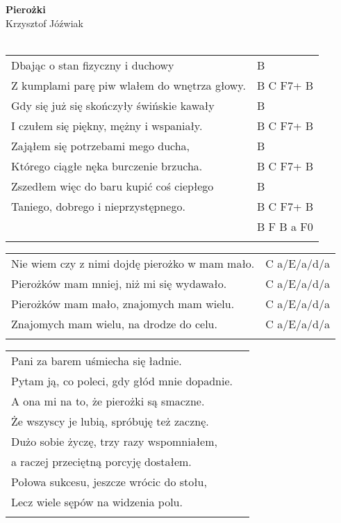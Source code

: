 \documentclass[a5paper]{article}
\begin{document}


\noindent
\fontsize{12pt}{15pt}\selectfont
\textbf{Pierożki} \\
\fontsize{8pt}{10pt}\selectfont
Krzysztof Jóźwiak \\ \\
\fontsize{10pt}{12pt}\selectfont
{}
\begin{tabular}{@{}p{8.50cm}p{3cm}@{}}
\noindent
Dbając o stan fizyczny i duchowy & B \\
Z kumplami parę piw wlałem do wnętrza głowy. & B C F7+ B \\
Gdy się już się skończyły świńskie kawały & B \\
I czułem się piękny, mężny i wspaniały. & B C F7+ B \\
Zająłem się potrzebami mego ducha, & B \\
Którego ciągłe nęka burczenie brzucha. & B C F7+ B \\
Zszedłem więc do baru kupić coś ciepłego & B \\
Taniego, dobrego i nieprzystępnego. & B C F7+ B \\
& B F B a F0 \\ \\
\end{tabular}

\noindent
\begin{tabular}{@{}p{7.50cm}p{3cm}@{}}
Nie wiem czy z nimi dojdę pierożko w mam mało. & C a/E/a/d/a \\
Pierożków mam mniej, niż mi się wydawało.& C a/E/a/d/a \\
Pierożków mam mało, znajomych mam wielu. & C a/E/a/d/a \\
Znajomych mam wielu, na drodze do celu. & C a/E/a/d/a \\ \\
\end{tabular}

\noindent
\begin{tabular}{@{}p{9.50cm}p{3cm}@{}}
Pani za barem uśmiecha się ładnie.\\
Pytam ją, co poleci, gdy głód mnie dopadnie.\\
A ona mi na to, że pierożki są smaczne.\\
Że wszyscy je lubią, spróbuję też zacznę.\\
Dużo sobie życzę, trzy razy wspomniałem,\\
a raczej przeciętną porcyję dostałem.\\
Połowa sukcesu, jeszcze wrócic do stołu,\\
Lecz wiele sępów na widzenia polu.\\ \\
\end{tabular}
\end{document}
